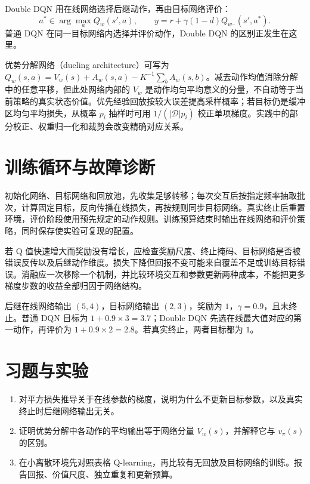 Double DQN 用在线网络选择后继动作，再由目标网络评价：
\[
a^*\in\arg\max_aQ_w(s',a),\qquad
y=r+\gamma(1-d)Q_{w^-}(s',a^*).
\]
普通 DQN 在同一目标网络内选择并评价动作，Double DQN 的区别正发生在这里。

优势分解网络（dueling architecture）可写为 $Q_w(s,a)=V_w(s)+A_w(s,a)-K^{-1}\sum_bA_w(s,b)$。减去动作均值消除分解中的任意平移，但此处网络内部的 $V_w$ 是动作均匀平均意义的分量，不自动等于当前策略的真实状态价值。优先经验回放按较大误差提高采样概率；若目标仍是缓冲区均匀平均损失，从概率 $p_i$ 抽样时可用 $1/(|\mathcal D|p_i)$ 校正单项梯度。实践中的部分校正、权重归一化和裁剪会改变精确对应关系。

\section{训练循环与故障诊断}

初始化网络、目标网络和回放池，先收集足够转移；每次交互后按指定频率抽取批次，计算固定目标，反向传播在线损失，再按规则同步目标网络。真实终止后重置环境，评价阶段使用预先规定的动作规则。训练预算结束时输出在线网络和评价策略，同时保存使实验可复现的配置。

若 Q 值快速增大而奖励没有增长，应检查奖励尺度、终止掩码、目标网络是否被错误反传以及后继动作维度。损失下降但回报不变可能来自覆盖不足或训练目标错误。消融应一次移除一个机制，并比较环境交互和参数更新两种成本，不能把更多梯度步数的收益全部归因于网络结构。

\begin{example}[普通与双重目标]
后继在线网络输出 $(5,4)$，目标网络输出 $(2,3)$，奖励为 $1$，$\gamma=0.9$，且未终止。普通 DQN 目标为 $1+0.9\times3=3.7$；Double DQN 先选在线最大值对应的第一动作，再评价为 $1+0.9\times2=2.8$。若真实终止，两者目标都为 $1$。
\end{example}

\section{习题与实验}
\begin{enumerate}
\item 对平方损失推导关于在线参数的梯度，说明为什么不更新目标参数，以及真实终止时后继网络输出无关。
\item 证明优势分解中各动作的平均输出等于网络分量 $V_w(s)$，并解释它与 $v_\pi(s)$ 的区别。
\item 在小离散环境先对照表格 Q-learning，再比较有无回放及目标网络的训练。报告回报、价值尺度、独立重复和更新预算。
\end{enumerate}





